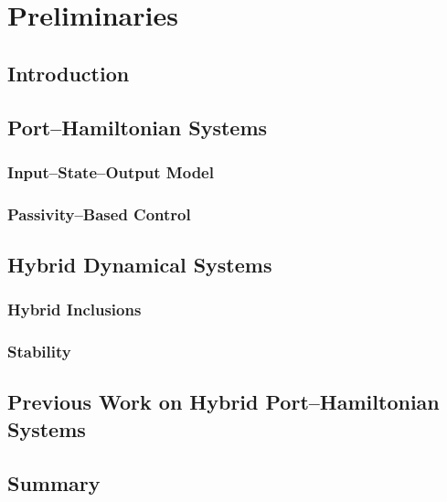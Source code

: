 
\chapter{Preliminaries}
\label{chap:preliminaries}
\minitoc

\thispagestyle{empty}

\newpage
\section{Introduction\label{sec:2_intro}}

\section{Port--Hamiltonian Systems\label{sec:PH_systems}}
\subsection{Input--State--Output Model}
\subsection{Passivity--Based Control}
%

\section{Hybrid Dynamical Systems\label{sec:HD_systems}}
\subsection{Hybrid Inclusions}
\subsection{Stability}


\section{Previous Work on Hybrid Port--Hamiltonian Systems}


\section{Summary}




